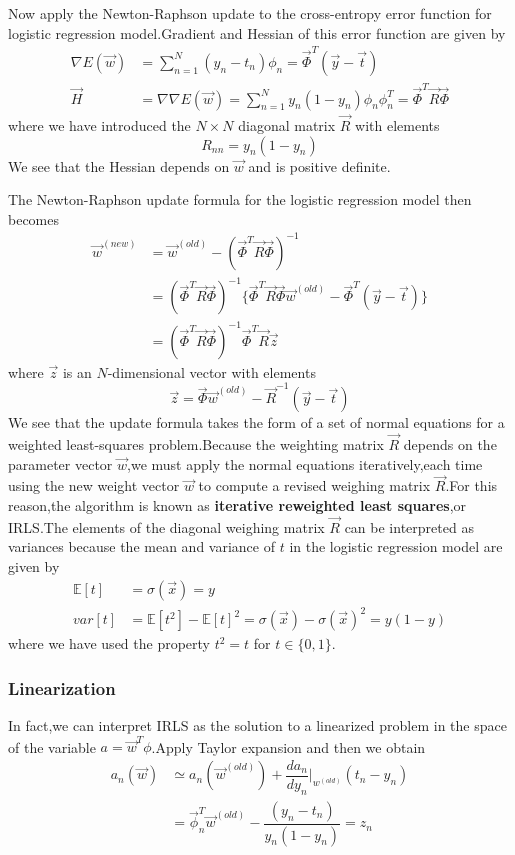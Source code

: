 Now apply the Newton-Raphson update to the cross-entropy  error function for logistic regression model.Gradient and Hessian of this error function are given by
\begin{align}
\nabla E(\vec{w})&=\sum_{n=1}^{N}(y_n-t_n)\phi_n
=\vec{\Phi}^T(\vec{y}-\vec{t}) \\
\vec{H} &= \nabla\nabla E(\vec{w})= \sum_{n=1}^{N}y_n(1-y_n)\phi_n\phi_n^T=\vec{\Phi}^T\vec{R}\vec{\Phi}
\end{align}
where we have introduced the $N\times N$ diagonal matrix $\vec{R}$ with elements
\begin{equation}
R_{nn}=y_n(1-y_n)
\end{equation}
We see that the Hessian depends on $\vec{w}$ and is positive definite.

The Newton-Raphson update formula for the logistic regression model then becomes
\begin{align}
\vec{w}^{(new)} &= \vec{w}^{(old)} -(\vec{\Phi}^T\vec{R}\vec{\Phi})^{-1} \\
&=(\vec{\Phi}^T\vec{R}\vec{\Phi})^{-1}\{\vec{\Phi}^T\vec{R}\vec{\Phi}\vec{w}^{(old)} -\vec{\Phi}^T(\vec{y}-\vec{t}) \} \\
&=(\vec{\Phi}^T\vec{R}\vec{\Phi})^{-1}\vec{\Phi}^T\vec{R}\vec{z}
\end{align}
where $\vec{z}$ is an $N$-dimensional vector with elements
\begin{equation}
\vec{z} = \vec{\Phi}\vec{w}^{(old)}-\vec{R}^{-1}(\vec{y}-\vec{t})
\end{equation}
We see that the update formula takes the form of a set of normal equations for a weighted least-squares problem.Because the weighting matrix $\vec{R}$ depends on the parameter vector $\vec{w}$,we must apply the normal equations iteratively,each time using the new weight vector $\vec{w}$ to compute a revised weighing matrix $\vec{R}$.For this reason,the algorithm is known as \textbf{iterative reweighted least squares},or IRLS.The elements of the diagonal weighing matrix $\vec{R}$ can be interpreted as variances because the mean and variance of $t$ in the logistic regression model are given by
\begin{align}
\mathbb{E}[t] &=\sigma(\vec{x}) = y\\
var[t]&=\mathbb{E}[t^2] -\mathbb{E}[t]^2 = \sigma(\vec{x})-\sigma(\vec{x})^2 = y(1-y)
\end{align}
where we have used the property $t^2=t$ for $t\in \{0,1\}$.

\subsubsection{Linearization}
In fact,we can interpret IRLS as the solution to a linearized problem in the space of the variable $a=\vec{w}^T\phi$.Apply Taylor expansion and then we obtain
\begin{align}
a_n(\vec{w}) &\simeq a_n(\vec{w}^{(old)})+\dfrac{da_n}{dy_n}\bigg|_{w^{(old)}}(t_n-y_n) \\
&=\vec{\phi}_n^T\vec{w}^{(old)}-\dfrac{(y_n-t_n)}{y_n(1-y_n)} =z_n
\end{align}

